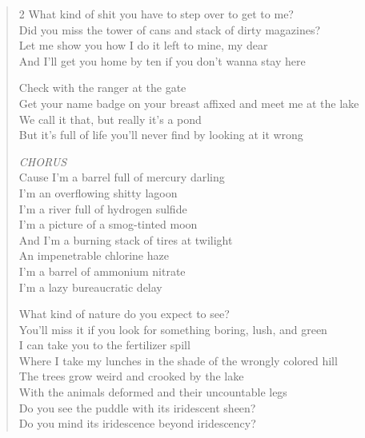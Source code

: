 \documentclass[11pt]{book}
\begin{document}
\begin{verse}
\begin{multicols}{2}
\tiny
What kind of shit you have to step over to get to me? \\
Did you miss the tower of cans and stack of dirty magazines? \\
Let me show you how I do it left to mine, my dear \\
And I'll get you home by ten if you don't wanna stay here

Check with the ranger at the gate \\
Get your name badge on your breast affixed and meet me at the lake \\
We call it that, but really it's a pond \\
But it's full of life you'll never find by looking at it wrong

\hspace{2em} \emph{CHORUS}\\
\hspace{2em} Cause I'm a barrel full of mercury darling \\
\hspace{2em} I'm an overflowing shitty lagoon \\
\hspace{2em} I'm a river full of hydrogen sulfide \\
\hspace{2em} I'm a picture of a smog-tinted moon \\
\hspace{2em} And I'm a burning stack of tires at twilight \\
\hspace{2em} An impenetrable chlorine haze \\
\hspace{2em} I'm a barrel of ammonium nitrate \\
\hspace{2em} I'm a lazy bureaucratic delay

What kind of nature do you expect to see? \\
You'll miss it if you look for something boring, lush, and green \\
I can take you to the fertilizer spill \\
Where I take my lunches in the shade of the wrongly colored hill \\
The trees grow weird and crooked by the lake \\
With the animals deformed and their uncountable legs \\
Do you see the puddle with its iridescent sheen? \\
Do you mind its iridescence beyond iridescency?


\end{multicols}
\end{verse}
\end{document}
